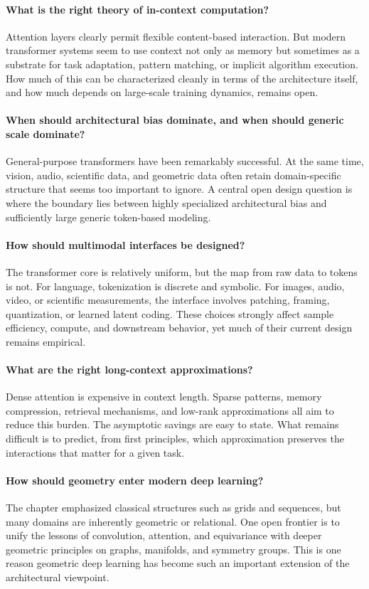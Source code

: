 \paragraph{What is the right theory of in-context computation?}
Attention layers clearly permit flexible content-based interaction.
But modern transformer systems seem to use context not only as memory but sometimes as a substrate for task adaptation, pattern matching, or implicit algorithm execution.
How much of this can be characterized cleanly in terms of the architecture itself, and how much depends on large-scale training dynamics, remains open.

\paragraph{When should architectural bias dominate, and when should generic scale dominate?}
General-purpose transformers have been remarkably successful.
At the same time, vision, audio, scientific data, and geometric data often retain domain-specific structure that seems too important to ignore.
A central open design question is where the boundary lies between highly specialized architectural bias and sufficiently large generic token-based modeling.

\paragraph{How should multimodal interfaces be designed?}
The transformer core is relatively uniform, but the map from raw data to tokens is not.
For language, tokenization is discrete and symbolic.
For images, audio, video, or scientific measurements, the interface involves patching, framing, quantization, or learned latent coding.
These choices strongly affect sample efficiency, compute, and downstream behavior, yet much of their current design remains empirical.

\paragraph{What are the right long-context approximations?}
Dense attention is expensive in context length.
Sparse patterns, memory compression, retrieval mechanisms, and low-rank approximations all aim to reduce this burden.
The asymptotic savings are easy to state.
What remains difficult is to predict, from first principles, which approximation preserves the interactions that matter for a given task.

\paragraph{How should geometry enter modern deep learning?}
The chapter emphasized classical structures such as grids and sequences, but many domains are inherently geometric or relational.
One open frontier is to unify the lessons of convolution, attention, and equivariance with deeper geometric principles on graphs, manifolds, and symmetry groups.
This is one reason geometric deep learning has become such an important extension of the architectural viewpoint.

